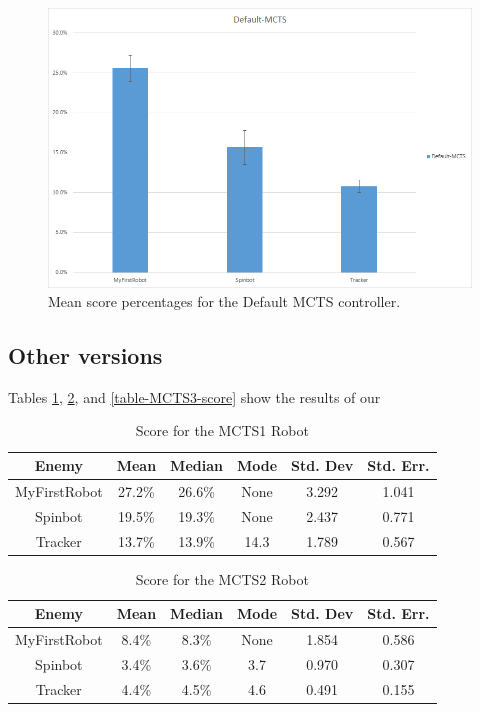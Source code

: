 \begin{figure}[htp]
\centerline{\includegraphics[width=\columnwidth]{Images/BarGraph}}
\caption{Mean score percentages for the Default MCTS controller.}
\label{figure--BarGraph}
\end{figure}

\subsection{Other versions}
Tables \ref{table-MCTS1-score}, \ref{table-MCTS2-score}, and \ref{table-MCTS3-score} show the results of our 


\begin{table}
\begin{center}
\renewcommand{\arraystretch}{1.3}
\caption{Score for the MCTS1 Robot}
\label{table-MCTS1-score}
\begin{tabular}{|c | c | c |c | c| c |}
\hline
Enemy & Mean & Median & Mode & Std. Dev & Std. Err.\\
\hline
MyFirstRobot & 27.2\% & 26.6\% & None & 3.292 & 1.041\\
\hline
Spinbot & 19.5\% & 19.3\% & None & 2.437 & 0.771 \\
\hline
Tracker & 13.7\% & 13.9\% & 14.3 & 1.789 & 0.567 \\
\hline
\end{tabular}
\end{center}
\end{table}

\begin{table}
\begin{center}
\renewcommand{\arraystretch}{1.3}
\caption{Score for the MCTS2 Robot}
\label{table-MCTS2-score}
\begin{tabular}{|c | c | c |c | c| c |}
\hline
Enemy & Mean & Median & Mode & Std. Dev & Std. Err.\\
\hline
MyFirstRobot & 8.4\% & 8.3\% & None & 1.854 & 0.586\\
\hline
Spinbot & 3.4\% & 3.6\% & 3.7 & 0.970 & 0.307  \\
\hline
Tracker & 4.4\% & 4.5\% & 4.6 & 0.491 & 0.155 \\
\hline
\end{tabular}
\end{center}
\end{table}

